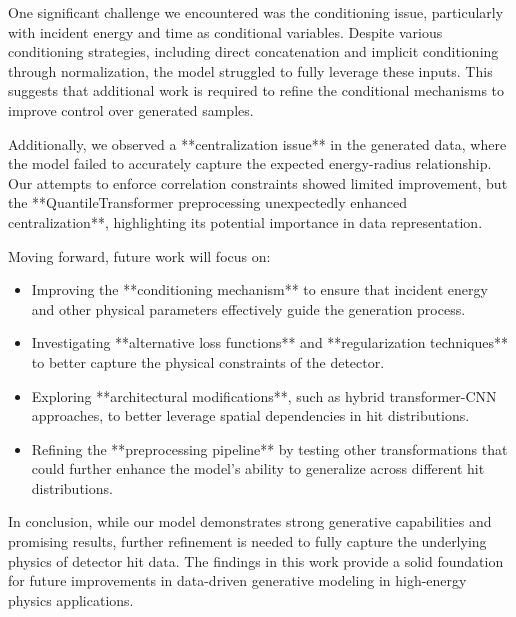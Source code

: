One significant challenge we encountered was the conditioning issue, particularly with incident energy and time as conditional variables. Despite various conditioning strategies, including direct concatenation and implicit conditioning through normalization, the model struggled to fully leverage these inputs. This suggests that additional work is required to refine the conditional mechanisms to improve control over generated samples.

Additionally, we observed a **centralization issue** in the generated data, where the model failed to accurately capture the expected energy-radius relationship. Our attempts to enforce correlation constraints showed limited improvement, but the **QuantileTransformer preprocessing unexpectedly enhanced centralization**, highlighting its potential importance in data representation.

Moving forward, future work will focus on:
\begin{itemize}
    \item Improving the **conditioning mechanism** to ensure that incident energy and other physical parameters effectively guide the generation process.
    \item Investigating **alternative loss functions** and **regularization techniques** to better capture the physical constraints of the detector.
    \item Exploring **architectural modifications**, such as hybrid transformer-CNN approaches, to better leverage spatial dependencies in hit distributions.
    \item Refining the **preprocessing pipeline** by testing other transformations that could further enhance the model's ability to generalize across different hit distributions.
\end{itemize}

In conclusion, while our model demonstrates strong generative capabilities and promising results, further refinement is needed to fully capture the underlying physics of detector hit data. The findings in this work provide a solid foundation for future improvements in data-driven generative modeling in high-energy physics applications.




